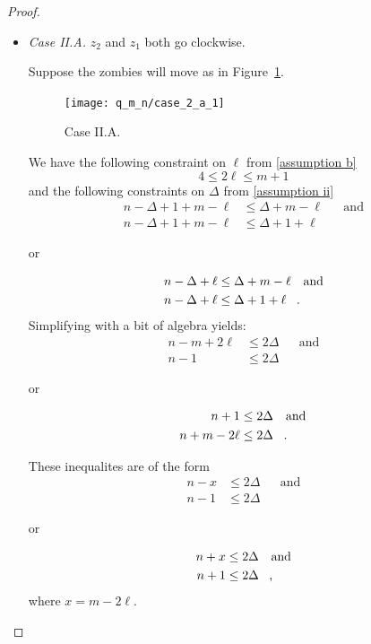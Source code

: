 \begin{proof}
\begin{proofpart}
\begin{itemize}
  \item \textit{Case II.A.} $z_2$ and $z_1$ both go clockwise.

  Suppose the zombies will move as in Figure~\ref{fig:case_2_a_1}.
  \begin{figure}
    \centering
    \texttt{[image: q\_m\_n/case\_2\_a\_1]}
    \caption{Case II.A. \label{fig:case_2_a_1}}
  \end{figure}

  We have the following constraint on $\ell$ from \ref{assumption b}
  \[ 4 \leq 2 \ell \leq m + 1 \]
  and the following constraints on $\Delta$ from \ref{assumption ii}
  \begin{align*}
   n - \Delta + 1 + m - \ell &\leq \Delta + m - \ell && \text{and} \\
   n - \Delta + 1 + m - \ell &\leq \Delta + 1 + \ell
  \end{align*}
  \begin{center}or\end{center}
    \begin{align*}
     n - \Delta + \ell &\leq \Delta + m - \ell && \text{and} \\
     n - \Delta + \ell &\leq \Delta + 1 + \ell \mperiod
    \end{align*}
  Simplifying with a bit of algebra yields:
  \begin{align*}
   n-m +2\ell &\leq 2 \Delta && \text{and} \\
   n-1 &\leq 2\Delta
  \end{align*}
  \begin{center}or\end{center}
  \begin{align*}
   n + 1 &\leq 2 \Delta && \text{and} \\
   n + m - 2\ell &\leq 2 \Delta \mperiod
  \end{align*}

  These inequalites are of the form
  \begin{align*}
   n-x &\leq 2 \Delta && \text{and} \\
   n-1 &\leq 2\Delta
  \end{align*}
  \begin{center}or\end{center}
  \begin{align*}
   n + x &\leq 2 \Delta && \text{and} \\
   n + 1 &\leq 2 \Delta \mcomma
  \end{align*}
where $x = m -2\ell$.


\end{itemize}
\end{proofpart}
\end{proof}
